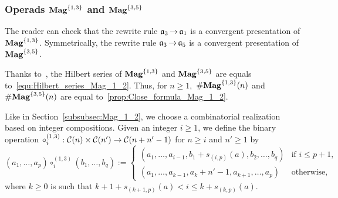 \subsubsection{Operads $\mathbf{Mag}^{\{1, 3\}}$ and $\mathbf{Mag}^{\{3, 5\}}$}
The reader can check that the rewrite rule $\mathfrak{a}_3 \operatorname{\to} \mathfrak{a}_1$ is a
convergent presentation of $\mathbf{Mag}^{\{1, 3\}}$. Symmetrically, the rewrite
rule $\mathfrak{a}_3 \operatorname{\to} \mathfrak{a}_5$ is a convergent presentation of
$\mathbf{Mag}^{\{3, 5\}}$.
\medbreak

Thanks to~\cite{Gir18}, the Hilbert series of $\mathbf{Mag}^{\{1, 3\}}$ and
$\mathbf{Mag}^{\{3, 5\}}$ are equals to~\eqref{equ:Hilbert_series_Mag_1_2}. Thus,
for $n \geq 1,$ $\# \mathbf{Mag}^{\{1, 3\}}(n)$ and $\# \mathbf{Mag}^{\{3, 5\}}(n)$ are
equal to~\eqref{prop:Close_formula_Mag_1_2}.
\medbreak

Like in Section~\ref{subsubsec:Mag_1_2}, we choose a combinatorial
 realization based on
integer compositions. Given an integer $i \geq 1$, we define the
binary operation
$\circ_i^{(1,3)} : \mathcal{C}(n) \times \mathcal{C}(n')\rightarrow
\mathcal{C}(n + n' -1)$ for
$n \geq i$ and $n' \geq 1$ by
\begin{equation}
    \left(a_1, \dots, a_p\right) \circ_i^{(1,3)}
    \left(b_1, \dots, b_{q}\right)
    :=
    \begin{cases}
        \left(a_1, \dots ,a_{i-1}, b_1 + s_{(i,p)}(a),
        b_2,\dots,b_{q}\right) &
        \mbox{if } i \leq p + 1, \\
        \left(a_1, \dots, a_{k-1}, a_{k} + n'-1, a_{k+1},
        \dots,a_{p}\right)
            & \mbox{otherwise},
    \end{cases}
\end{equation}
where $k \geq 0$ is such that
$k+1 + s_{(k+1,p)}(a) < i \leq k + s_{(k,p)}(a)$.
\medbreak

